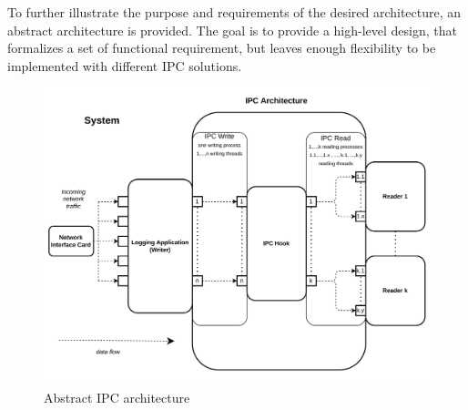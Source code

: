 To further illustrate the purpose and requirements of the desired architecture, an abstract architecture is provided.
The goal is to provide a high-level design, that formalizes a set of functional requirement, but leaves enough
flexibility to be implemented with different \ac{IPC} solutions.  

\begin{figure}[h!]
    \label{fig:abstract_architecture}
    \includegraphics[width=\textwidth]{images/meta_ipc_architecture.png}
    \caption[IPC Architecture]{Abstract \ac{IPC} architecture }
\end{figure}

